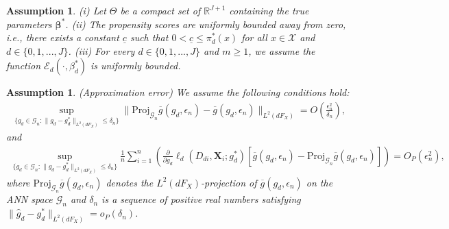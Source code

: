 \documentclass[11pt]{article}
\newtheorem{assumption}[]{Assumption}
\numberwithin{equation}{section}
\begin{document}


\begin{assumption}\label{as:parameter_beta}
	(i)	Let $\Theta$ be a compact set of $\mathbb{R}^{J+1}$ containing  the true parameters $\boldsymbol{\beta}^*$. (ii)  The propensity scores are uniformly bounded away from zero, i.e., there exists  a constant $\underline{c}$ such that  $0<\underline{c}\leq \pi^*_d(x)$ for all $x\in\mathcal{X}$ and $d\in\{0,1,...,J\}$. (iii) For every  $d\in\{0,1,...,J\}$ and $m\geq 1$, we assume the function $\mathcal{E}_d(\cdot,\beta_d^*)$  is uniformly bounded.
\end{assumption}
\begin{assumption}\label{as:app_error} (Approximation error) We assume the following conditions hold:
	\begin{align*}
		\sup_{\{g_d\in \mathcal{G}_n:\|g_d-g_d^*\|_{L^2(dF_X)}\leq \delta_n\} }\|\text{Proj}_{\mathcal{G}_{n}}\overline{g}({g}_d,\epsilon_n)-\overline{g}({g}_d,\epsilon_n) \|_{L^2(dF_X)} =O\left(\frac{\epsilon_n^2}{\delta_n}\right),
	\end{align*}
	and
	\begin{align*}
		\sup_{\{g_d\in \mathcal{G}_n:\|g_d-g_d^*\|_{L^2(dF_X)}\leq \delta_n\} }	\frac{1}{n}\sum_{i=1}^n\left(\frac{\partial}{\partial g_d}\ell_d(D_{di},\boldsymbol{X}_{i};g^*_d)[\overline{g}({g}_d,\epsilon_n)-\text{Proj}_{\mathcal{G}_{n}}\overline{g}({g}_d,\epsilon_n)]\right)=O_P(\epsilon_n^2),
	\end{align*}
	where $\text{Proj}_{\mathcal{G}_n}\overline{g}(g_d,\epsilon_n)$ denotes the $L^2(dF_X)$-projection of $\overline{g}(g_d,\epsilon_n)$ on the ANN space $\mathcal{G}_n$ and $\delta_n$ is a  sequence of positive real numbers satisfying $\|\widehat{g}_d-g_d^*\|_{L^2(dF_X)}=o_P(\delta_n)$.
\end{assumption}
\end{document}
